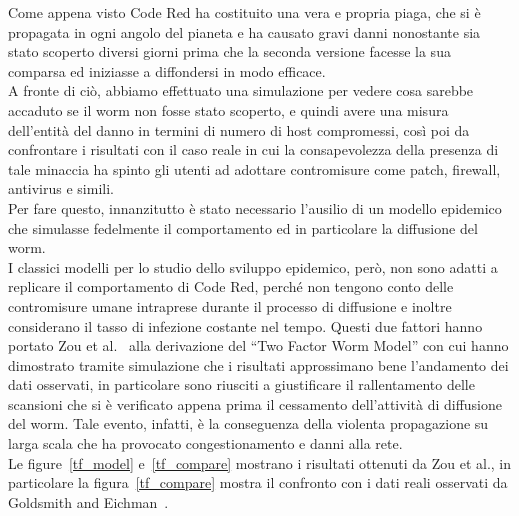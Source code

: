 Come appena visto Code Red ha costituito una vera e propria piaga, che si è propagata in ogni angolo del pianeta e ha causato gravi danni nonostante sia stato scoperto diversi giorni prima che la seconda versione facesse la sua comparsa ed iniziasse a diffondersi in modo efficace.\\
A fronte di ciò, abbiamo effettuato una simulazione per vedere cosa sarebbe accaduto se il worm non fosse stato scoperto, e quindi avere una misura dell’entità del danno in termini di numero di host compromessi, così poi da confrontare i risultati con il caso reale in cui la consapevolezza della presenza di tale minaccia ha spinto gli utenti ad adottare contromisure come patch, firewall, antivirus e simili.\\
Per fare questo, innanzitutto è stato necessario l’ausilio di un modello epidemico che simulasse fedelmente il comportamento ed in particolare la diffusione del worm.\\
I classici modelli per lo studio dello sviluppo epidemico, però, non sono adatti a replicare il comportamento di Code Red, perché non tengono conto delle contromisure umane intraprese durante il processo di diffusione e inoltre considerano il tasso di infezione costante nel tempo. Questi due fattori hanno portato Zou et al.~\cite{two-factor} alla derivazione del “Two Factor Worm Model” con cui hanno dimostrato tramite simulazione che i risultati approssimano bene l’andamento dei dati osservati, in particolare sono riusciti a giustificare il rallentamento delle scansioni che si è verificato appena prima il cessamento dell’attività di diffusione del worm. Tale evento, infatti, è la conseguenza della violenta propagazione su larga scala che ha provocato congestionamento e danni alla rete.\\
Le figure~\ref{tf_model} e~\ref{tf_compare} mostrano i risultati ottenuti da Zou et al., in particolare la figura~\ref{tf_compare} mostra il confronto con i dati reali osservati da Goldsmith and Eichman~\cite{gold, eich}.\\
